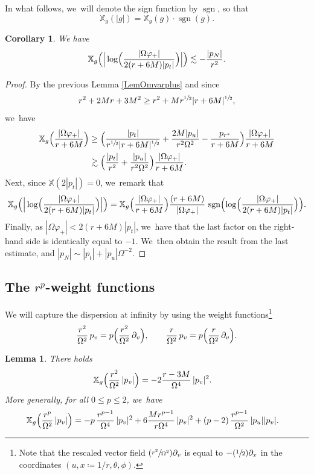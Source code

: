 \documentclass[JEP,XML,SOM,Unicode,published]{cedram}
\newcommand{\Psfrac}[2]{(\sfrac{#1}{#2})}
\DeclareMathOperator{\sgn}{sgn}
\theoremstyle{plain}
\newtheorem{lemma}[proposition]{Lemma}
\newtheorem{corollary}[proposition]{Corollary}
\theoremstyle{definition}
\newcommand\T{{\mathbb{X}}}
\begin{document}
In what follows, we~will denote the sign function by $\sgn$, so that
\[\T_g(|g|)=\T_g(g) \cdot \sgn(g).\]

\begin{corollary}\label{Corlogvarphiplus}
We have
\[
\T_g \Bigl(\Big|\log \Bigl(\frac{|\Omega\varphi_+|}{2(r+6M)|p_t|} \Bigr) \Big| \Bigr) \lesssim- \frac{|p_N|}{r^2}.
\]
\end{corollary}

\begin{proof}
By the previous Lemma \ref{LemOmvarplus} and since
\[
r^2+2Mr+3M^2 \geq r^2+Mr^{\sfrac{1}{2}}|r+6M|^{\sfrac{1}{2}},
\]
we~have
\begin{align*}
\T_g \Bigl(\frac{|\Omega\varphi_+|}{r+6M} \Bigr) & \geq \Bigl(\frac{|p_t|}{r^{\sfrac{1}{2}}|r+6M|^{\sfrac{1}{2}} }+\frac{2M|p_u|}{r^2 \Omega^2}-\frac{p_{r^*}}{r+6M} \Bigr) \frac{|\Omega\varphi_+|}{r+6M} \\
& \gtrsim \Bigl(\frac{|p_t|}{r^2}+\frac{|p_u|}{r^2 \Omega^2} \Bigr) \frac{|\Omega\varphi_+|}{r+6M}.
\end{align*}
Next, since $\T(2|p_t|)=0$, we~remark that
\[
\T_g \Bigl(\Big|\log \Bigl(\frac{|\Omega\varphi_+|}{2(r+6M)|p_t|} \Bigr) \Big| \Bigr) = \T_g \Bigl(\frac{|\Omega\varphi_+|}{r+6M} \Bigr) \frac{(r+6M)}{|\Omega\varphi_+|}\, \sgn \Bigl(\log \Bigl(\frac{|\Omega\varphi_+|}{2(r+6M)|p_t|} \Bigr) \Bigr).
\]
Finally, as $ |\Omega \varphi_+| < 2 (r+6M)|p_t|$, we~have that the last factor on the right-hand side is identically equal to $-1$. We~then obtain the result from the last estimate, and $|p_N| \sim |p_t| +|p_u|\Omega^{-2}$.
\end{proof}

\subsection{The $r^p$-weight functions}

We will capture the dispersion at infinity by using the weight functions\footnote{Note that the rescaled vector field $\Psfrac{r^2}{\Omega^2}\partial_v$ is equal to $-\Psfrac{1}{2}\partial_x$ in the coordinates $(u, x\coloneqq1/r,\theta,\phi)$.}
\[
\frac{r^2}{\Omega^2}\,p_v=p\Bigl(\frac{r^2}{\Omega^2}\,\partial_v\Bigr), \qquad \frac{r}{\Omega^2}\,p_v=p\Bigl(\frac{r}{\Omega^2}\,\partial_v\Bigr).
\]

\begin{lemma}\label{Lemrp}
There holds
\begin{align*}
\T_g \Bigl(\frac{r^2}{\Omega^2}\, |p_v| \Bigr) & = -2\frac{r-3M}{\Omega^4}\,|p_v|^2.
\end{align*}
More generally, for all $0 \leq p \leq 2$, we~have
\begin{align*}
\T_g \Bigl(\frac{r^p}{\Omega^2}\, |p_v| \Bigr) & = -p\,\frac{r^{p-1}}{\Omega^4}\,|p_v|^2+6\frac{Mr^{p-1}}{r\Omega^4}\,|p_v|^2+(p-2)\,\frac{r^{p-1}}{\Omega^2}\,|p_u ||p_v|.
\end{align*}
\end{lemma}
\end{document}
